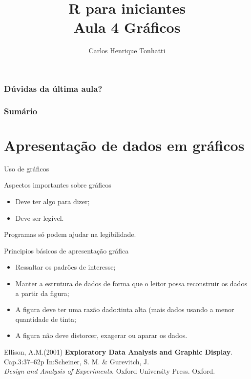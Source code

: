 \documentclass{beamer}
\title[Linguagem R]{R para iniciantes\\ Aula 4 Gráficos}
\author {Carlos Henrique Tonhatti}
\institute[Unicamp]{Universidade Estadual de Campinas}
\date{}
\begin{document}
\frame{\titlepage} %

\begin{frame}
  \frametitle{Dúvidas da última aula?}
\end{frame}

\begin{frame}
 \frametitle{Sumário}
 \tableofcontents[pausesections]
  \setcounter{tocdepth}{2}%
\end{frame}



\section{Apresentação de dados em gráficos}

\begin{frame}{Uso de gráficos}
\centering
{}
\end{frame}

\begin{frame}{Aspectos importantes sobre gráficos}

  \begin{itemize}
  \item Deve ter algo para dizer;
  \item Deve ser legível. 
  \end{itemize}
\pause
Programas só podem ajudar na legibilidade.   
\end{frame}

\begin{frame}{Principios básicos de apresentação gráfica}
  \begin{itemize}[<+->]
  \item Ressaltar os padrões de interesse;
  \item Manter a estrutura de dados de forma que o leitor possa reconstruir os dados a partir da figura;
  \item A figura deve ter uma razão dado:tinta alta (mais dados usando a menor quantidade de tinta;
  \item A figura não deve distorcer, exagerar ou aparar os dados.
  \end{itemize}
  \vfill{} \pause 
\tiny{Ellison, A.M.(2001) \textbf{Exploratory Data Analysis and Graphic Display}. Cap.3:37--62p In:Scheiner, S. M. \& Gurevitch, J.\\\hspace{20pt} \textit{Design and Analysis of Experiments}. Oxford University Press. Oxford.}
\end{frame}
\end{document}
